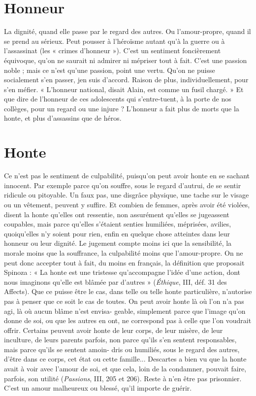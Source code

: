 \section{Honneur}
La dignité, quand elle passe par le regard des autres. Ou
l’amour-propre, quand il se prend au sérieux. Peut pousser à
l’héroïsme autant qu’à la guerre ou à l'assassinat (les « crimes d’honneur »).
C’est un sentiment foncièrement équivoque, qu’on ne saurait ni admirer ni
mépriser tout à fait. C’est une passion noble ; mais ce n’est qu’une passion,
point une vertu. Qu’on ne puisse socialement s’en passer, jen suis d’accord.
Raison de plus, individuellement, pour s’en méfier. « L’honneur national,
disait Alain, est comme un fusil chargé. » Et que dire de l’honneur de ces adolescents
qui s’entre-tuent, à la porte de nos collèges, pour un regard ou une
injure ? L’honneur a fait plus de morts que la honte, et plus d’assassins que de
héros.

\section{Honte}
Ce n’est pas le sentiment de culpabilité, puisqu’on peut avoir honte
en se sachant innocent. Par exemple parce qu’on souffre, sous le
regard d’autrui, de se sentir ridicule ou pitoyable. Un faux pas, une disgrâce
physique, une tache sur le visage ou un vêtement, peuvent y suffire. Et combien
de femmes, après avoir été violées, disent la honte qu’elles ont ressentie,
non assurément qu’elles se jugeassent coupables, mais parce qu’elles s'étaient
senties humiliées, méprisées, avilies, quoiqu’elles n’y soient pour rien, enfin en
quelque chose atteintes dans leur honneur ou leur dignité. Le jugement compte
moins ici que la sensibilité, la morale moins que la souffrance, la culpabilité
moins que l’amour-propre. On ne peut donc accepter tout à fait, du moins en
français, la définition que proposait Spinoza : « La honte est une tristesse
qu’accompagne l’idée d’une action, dont nous imaginons qu’elle est blâmée par
d’autres » ({\it Éthique}, III, déf. 31 des Affects). Que ce puisse être le cas, dans telle
ou telle honte particulière, n'autorise pas à penser que ce soit le cas de toutes.
On peut avoir honte là où l’on n’a pas agi, là où aucun blâme n’est envisa-
geable, simplement parce que l’image qu’on donne de soi, ou que les autres en
ont, ne correspond pas à celle que l’on voudrait offrir. Certains peuvent avoir
honte de leur corps, de leur misère, de leur inculture, de leurs parents parfois,
non parce qu'ils s’en sentent responsables, mais parce qu’ils se sentent amoin-
dris ou humiliés, sous le regard des autres, d’être dans ce corps, cet état ou cette
famille... Descartes a bien vu que la honte avait à voir avec l’amour de soi, et
que cela, loin de la condamner, pouvait faire, parfois, son utilité ({\it Passions}, III,
205 et 206). Reste à n’en être pas prisonnier. C’est un amour malheureux ou
blessé, qu’il importe de guérir.

